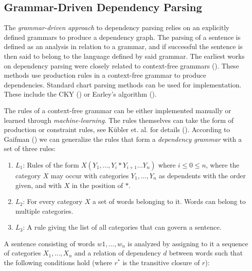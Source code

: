\documentclass[10pt]{article}
\begin{document}
\subsection{Grammar-Driven Dependency Parsing}

The \textit{grammar-driven approach} to dependency parsing relies on an explicitly defined grammars to produce a dependency graph. The parsing of a sentence is defined as an analysis in relation to a grammar, and if successful the sentence is then said to belong to the language defined by said grammar. The earliest works on dependency parsing were closely related to context-free grammars (\cite{kubler-sandra-mcdonald-ryan-nivre-book}). These methods use production rules in a context-free grammar to produce dependencies. Standard chart parsing methods can be used for implementation. These include the CKY (\cite{younger1967recognition}) or Earley’s algorithm (\cite{earley1970efficient}).

The rules of a context-free grammar can be either implemented manually or learned through \textit{machine-learning}. The rules themselves can take the form of production or constraint rules, see Kübler et. al. for details (\cite{kubler-sandra-mcdonald-ryan-nivre-book}). According to Gaifman (\cite{GAIFMAN1965304}) we can generalize the rules that form a \textit{dependency grammar} with a set of three rules:

\begin{enumerate}
\item \textit{$L_1$}: Rules of the form $X(Y_1, ..., Y_i * Y_{i + 1} ... Y_n)$ where $i \leq 0 \leq n$, where the category $X$ may occur with categories $Y_1, ... ,Y_n$ as dependents with the order given, and with $X$ in the position of $*$.
\item \textit{$L_2$}: For every category $X$ a set of words belonging to it. Words can belong to multiple categories.
\item \textit{$L_3$}: A rule giving the list of all categories that can govern a sentence.
\end{enumerate}

A sentence consisting of words $w1, . . ., w_n$ is analyzed by assigning to it a sequence of categories $X_1, . . ., X_n$ and a relation of dependency $d$ between words such that the following conditions hold (where $r^{*}$ is the transitive closure of $r$):
\end{document}
